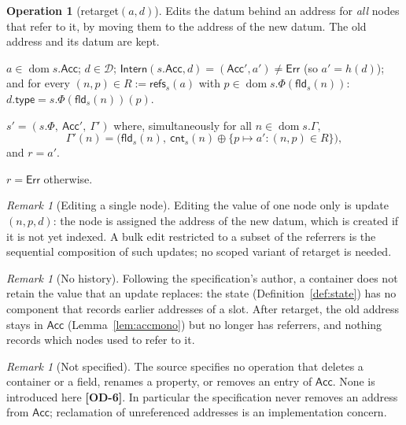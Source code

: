 \documentclass[11pt,a4paper]{article}
\theoremstyle{definition}
\newtheorem{operation}[definition]{Operation}
\theoremstyle{plain}
\theoremstyle{remark}
\newtheorem{remark}[definition]{Remark}
\newcommand{\od}[1]{\textsf{\textbf{\textcolor{BrickRed}{[OD-#1]}}}}
\newcommand{\Dat}{\mathcal{D}}
\newcommand{\Err}{\mathsf{Err}}
\newcommand{\dom}{\operatorname{dom}}
\newcommand{\fld}{\mathsf{fld}}
\newcommand{\cnt}{\mathsf{cnt}}
\newcommand{\refs}{\mathsf{refs}}
\newcommand{\Acc}{\mathsf{Acc}}
\newcommand{\Intern}{\mathsf{Intern}}
\begin{document}
\begin{operation}[\textsf{retarget}$(a,d)$]\label{op:retarget}
Edits the datum behind an address for \emph{all} nodes that refer to it, by moving them to the address of the new datum.
The old address and its datum are kept.
\begin{description}[leftmargin=2.2cm,labelwidth=2cm,font=\bfseries]
\item[Precondition] $a\in\dom s.\Acc$; $d\in\Dat$; $\Intern(s.\Acc,d)=(\Acc',a')\neq\Err$ (so $a'=h(d)$); and for every $(n,p)\in R:=\refs_s(a)$ with $p\in\dom s.\Phi(\fld_s(n))$: $d.\mathsf{type}=s.\Phi(\fld_s(n))(p)$.
\item[Effect] $s'=(s.\Phi,\ \Acc',\ \Gamma')$ where, simultaneously for all $n\in\dom s.\Gamma$,
\[
\Gamma'(n)=\big(\fld_s(n),\ \cnt_s(n)\oplus\{p\mapsto a' : (n,p)\in R\}\big),
\]
and $r=a'$.
\item[Failure] $r=\Err$ otherwise.
\end{description}
\end{operation}

\begin{remark}[Editing a single node]\label{rem:single}
Editing the value of one node only is \textsf{update}$(n,p,d)$: the node is assigned the address of the new datum, which is created if it is not yet indexed.
A bulk edit restricted to a subset of the referrers is the sequential composition of such updates; no scoped variant of \textsf{retarget} is needed.
\end{remark}

\begin{remark}[No history]\label{rem:nohistory}
Following the specification's author, a container does not retain the value that an \textsf{update} replaces:
the state (Definition~\ref{def:state}) has no component that records earlier addresses of a slot.
After \textsf{retarget}, the old address stays in $\Acc$ (Lemma~\ref{lem:accmono}) but no longer has referrers, and nothing records which nodes used to refer to it.
\end{remark}

\begin{remark}[Not specified]\label{rem:unspec}
The source specifies no operation that deletes a container or a field, renames a property, or removes an entry of $\Acc$.
None is introduced here \od{6}. In particular the specification never removes an address from $\Acc$; reclamation of unreferenced addresses is an implementation concern.
\end{remark}
\end{document}
